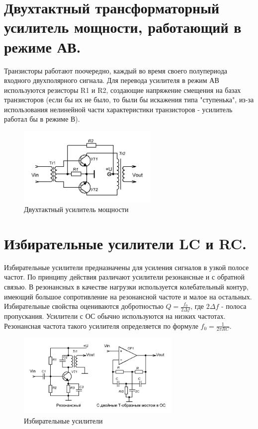 \documentclass[unicode, 12pt, a4paper, oneside]{article}
\begin{document}
\section{Двухтактный трансформаторный усилитель мощности, работающий в режиме АВ.}
Транзисторы работают поочередно, каждый во время своего полупериода входного двухполярного сигнала. Для перевода усилителя в режим АВ используются резисторы R1 и R2, создающие напряжение смещения на базах транзисторов (если бы их не было, то были бы искажения типа "ступенька", из-за использования нелинейной части характеристики транзисторов - усилитель работал бы в режиме В).
\begin{figure}[H]
\centering
\includegraphics[width=0.6\textwidth]{145.jpg}
\caption{Двухтактный усилитель мощности}
\end{figure}

\section{Избирательные усилители LC и RC.}

Избирательные усилители предназначены для усиления сигналов в узкой полосе частот. По принципу действия различают усилители резонансные и с обратной связью. В резонансных в качестве нагрузки используется колебательный контур, имеющий большое сопротивление на резонансной частоте и малое на остальных. Избирательные свойства оцениваются добротностью $Q = \frac{f_0}{2 \Delta f}$, где $2 \Delta f$ - полоса пропускания.
Усилители с ОС обычно используются на низких частотах. Резонансная частота такого усилителя определяется по формуле $f_0 = \frac{1}{2 \pi R C}$.
\begin{figure}[H]
\centering
\includegraphics[width=0.7\textwidth]{146.jpg}
\caption{Избирательные усилители}
\end{figure}
\end{document}
